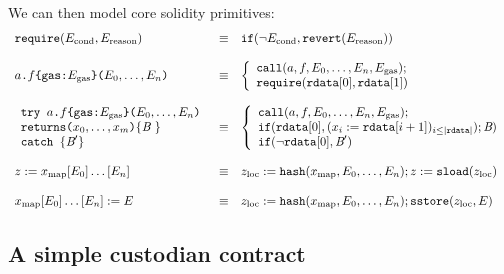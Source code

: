 \documentclass[12pt]{extarticle}
\begin{document}
We can then model core solidity primitives:
$$\begin{array}{lll}
\texttt{require}(E_\textrm{cond},E_\textrm{reason}) &\equiv& \mathtt{if}(\neg E_\textrm{cond},\mathtt{revert}(E_\textrm{reason}))\\\\
\texttt{$a$.$f$\{gas:$E_\textrm{gas}$\}($E_0,\dots,E_n$)} &\equiv& \left\{
\begin{array}{l}
    \mathtt{call}(a,f,E_0,\dots,E_n,E_\textrm{gas}); \\
    \texttt{require}(\mathtt{rdata}[0],\mathtt{rdata}[1])
\end{array}\right. \\\\
\begin{array}{l}
\texttt{try $a$.$f$\{gas:$E_\textrm{gas}$\}($E_0,\dots,E_n$)}\\
\texttt{returns($x_0,\dots,x_m$)}\{\textit{B}\ \}\\
\texttt{catch } \{\textit{B}'\} \end{array} &\equiv& \left\{
    \begin{array}{l}
        \mathtt{call}(a,f,E_0,\dots,E_n,E_\textrm{gas}); \\
        \mathtt{if}(\mathtt{rdata}[0], (x_i:=\mathtt{rdata}[i+1])_{i\leq |\mathtt{rdata}|});\textit{B}) \\
        \mathtt{if}(\neg\mathtt{rdata}[0], \textit{B}')
    \end{array}\right. \\\\
z:=x_{\rm map}[E_0]\dots[E_n] &\equiv& z_{\rm loc}:=\mathtt{hash}(x_{\rm map},E_0,\dots,E_n); z:=\mathtt{sload}(z_{\rm loc})\\\\
x_{\rm map}[E_0]\dots[E_n]:=E &\equiv& z_{\rm loc}:=\mathtt{hash}(x_{\rm map},E_0,\dots,E_n); \mathtt{sstore}(z_{\rm loc},E)
\end{array}
$$

\subsection{A simple custodian contract}\label{sec:ERC20}



\end{document}
